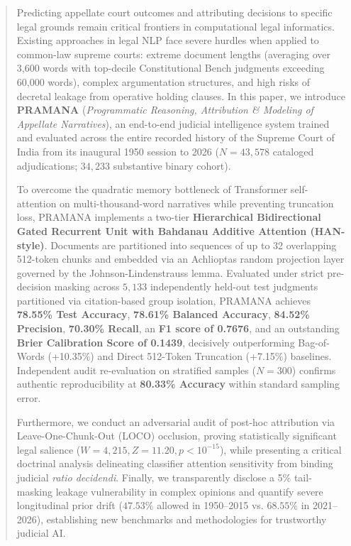 \documentclass[journal,10pt,twocolumn]{IEEEtran}
\begin{document}
\begin{abstract}
Predicting appellate court outcomes and attributing decisions to specific legal grounds remain critical frontiers in computational legal informatics. Existing approaches in legal NLP face severe hurdles when applied to common-law supreme courts: extreme document lengths (averaging over 3,600 words with top-decile Constitutional Bench judgments exceeding 60,000 words), complex argumentation structures, and high risks of decretal leakage from operative holding clauses. In this paper, we introduce \textbf{PRAMANA} (\textit{Programmatic Reasoning, Attribution \& Modeling of Appellate Narratives}), an end-to-end judicial intelligence system trained and evaluated across the entire recorded history of the Supreme Court of India from its inaugural 1950 session to 2026 ($N = 43,578$ cataloged adjudications; $34,233$ substantive binary cohort).

To overcome the quadratic memory bottleneck of Transformer self-attention on multi-thousand-word narratives while preventing truncation loss, PRAMANA implements a two-tier \textbf{Hierarchical Bidirectional Gated Recurrent Unit with Bahdanau Additive Attention (HAN-style)}. Documents are partitioned into sequences of up to 32 overlapping 512-token chunks and embedded via an Achlioptas random projection layer governed by the Johnson-Lindenstrauss lemma. Evaluated under strict pre-decision masking across $5,133$ independently held-out test judgments partitioned via citation-based group isolation, PRAMANA achieves \textbf{78.55\% Test Accuracy}, \textbf{78.61\% Balanced Accuracy}, \textbf{84.52\% Precision}, \textbf{70.30\% Recall}, an \textbf{F1 score of 0.7676}, and an outstanding \textbf{Brier Calibration Score of 0.1439}, decisively outperforming Bag-of-Words (+10.35\%) and Direct 512-Token Truncation (+7.15\%) baselines. Independent audit re-evaluation on stratified samples ($N=300$) confirms authentic reproducibility at \textbf{80.33\% Accuracy} within standard sampling error.

Furthermore, we conduct an adversarial audit of post-hoc attribution via Leave-One-Chunk-Out (LOCO) occlusion, proving statistically significant legal salience ($W = 4,215, Z = 11.20, p < 10^{-15}$), while presenting a critical doctrinal analysis delineating classifier attention sensitivity from binding judicial \textit{ratio decidendi}. Finally, we transparently disclose a 5\% tail-masking leakage vulnerability in complex opinions and quantify severe longitudinal prior drift ($47.53\%$ allowed in 1950--2015 vs. $68.55\%$ in 2021--2026), establishing new benchmarks and methodologies for trustworthy judicial AI.
\end{abstract}
\end{document}
